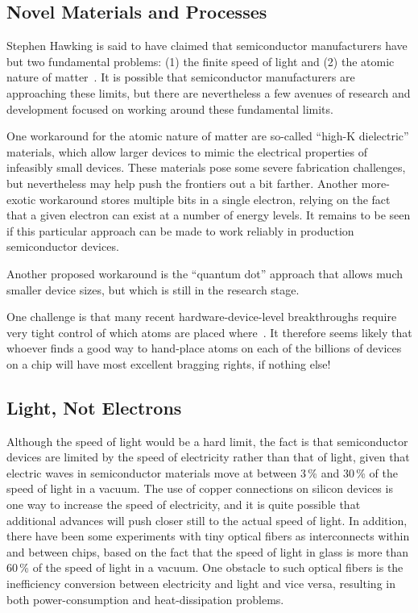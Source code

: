 \subsection{Novel Materials and Processes}
\label{sec:cpu:Novel Materials and Processes}

Stephen Hawking is said to have claimed that semiconductor manufacturers
have but two fundamental problems: (1) the finite speed of light and
(2) the atomic nature of matter~\cite{BryanGardiner2007}.
It is possible that semiconductor manufacturers are approaching these
limits, but there are nevertheless a few avenues of research and
development focused on working around these fundamental limits.

One workaround for the atomic nature of matter are so-called
``high-K dielectric'' materials, which allow larger devices to mimic the
electrical properties of infeasibly small devices.
These materials pose some severe fabrication challenges, but nevertheless
may help push the frontiers out a bit farther.
Another more-exotic workaround stores multiple bits in a single electron,
relying on the fact that a given electron can exist at a number of
energy levels.
It remains to be seen if this particular approach can be made to work
reliably in production semiconductor devices.

Another proposed workaround is the ``quantum dot'' approach that
allows much smaller device sizes, but which is still in the research
stage.

One challenge is that many recent hardware-device-level breakthroughs
require very tight control of which atoms are placed
where~\cite{MichaelJKelly2017DeviceLevel}.
It therefore seems likely that whoever finds a good way to hand-place
atoms on each of the billions of devices on a chip will have most
excellent bragging rights, if nothing else!

\subsection{Light, Not Electrons}
\label{sec:cpu:Light, Not Electrons}

%
Although the speed of light would be a hard limit, the fact is that
semiconductor devices are limited by the speed of electricity rather
than that of light, given that electric waves in semiconductor materials
move at between 3\,\% and 30\,\% of the speed of light in a vacuum.
The use of copper connections on silicon devices is one way to increase
the speed of electricity, and it is quite possible that additional
advances will push closer still to the actual speed of light.
In addition, there have been some experiments with tiny optical fibers
as interconnects within and between chips, based on the fact that
the speed of light in glass is more than 60\,\% of the speed of light
in a vacuum.
One obstacle to such optical fibers is the inefficiency conversion
between electricity and light and vice versa, resulting in both
power-consumption and heat-dissipation problems.

